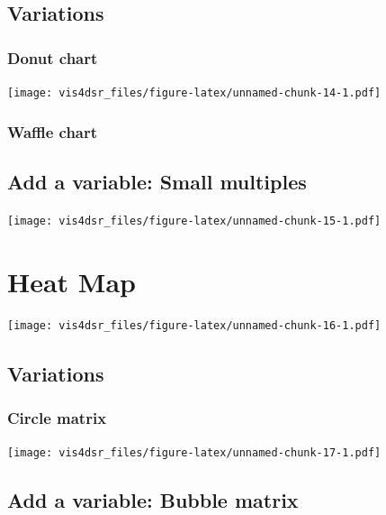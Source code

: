 \documentclass[
]{krantz}
\begin{document}
\hypertarget{variations-3}{%
\subsection{Variations}\label{variations-3}}

\hypertarget{donut-chart}{%
\subsubsection{Donut chart}\label{donut-chart}}

\texttt{[image: vis4dsr\_files/figure-latex/unnamed-chunk-14-1.pdf]}

\hypertarget{waffle-chart}{%
\subsubsection{Waffle chart}\label{waffle-chart}}

\hypertarget{add-a-variable-small-multiples}{%
\subsection{Add a variable: Small multiples}\label{add-a-variable-small-multiples}}

\texttt{[image: vis4dsr\_files/figure-latex/unnamed-chunk-15-1.pdf]}

\hypertarget{heat-map}{%
\section{Heat Map}\label{heat-map}}

\texttt{[image: vis4dsr\_files/figure-latex/unnamed-chunk-16-1.pdf]}

\hypertarget{variations-4}{%
\subsection{Variations}\label{variations-4}}

\hypertarget{circle-matrix}{%
\subsubsection{Circle matrix}\label{circle-matrix}}

\texttt{[image: vis4dsr\_files/figure-latex/unnamed-chunk-17-1.pdf]}

\hypertarget{add-a-variable-bubble-matrix}{%
\subsection{Add a variable: Bubble matrix}\label{add-a-variable-bubble-matrix}}
\end{document}
